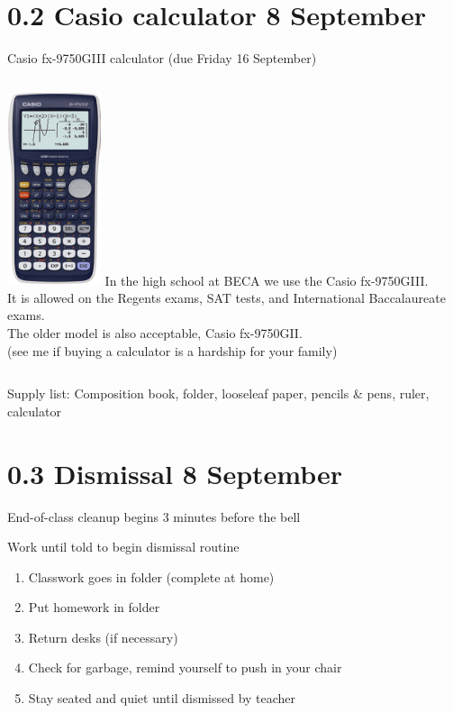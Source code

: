 \documentclass[onlytextwidth]{beamer}
\begin{document}
\section{0.2 Casio calculator \hfill 8 September}
\begin{frame}{Casio fx-9750GIII calculator (due Friday 16 September)}
  \begin{columns}
      \includegraphics[width=2.75cm]{../graphics/casio_fx-9750GII.png}
      In the high school at BECA we use the Casio fx-9750GIII.\\[5pt] 
      It is allowed on the Regents exams, SAT tests, and International Baccalaureate exams.\\[5pt]
      The older model is also acceptable, Casio fx-9750\alert{GII}.\\[5pt]
      (see me if buying a calculator is a hardship for your family)
    \end{columns} \vspace{1cm}
  Supply list: Composition book, folder, looseleaf paper, pencils \& pens, ruler, calculator
\end{frame}

\section{0.3 Dismissal \hfill 8 September}
\begin{frame}{End-of-class cleanup begins 3 minutes before the bell}
  \begin{block}{Work until told to begin dismissal routine}
    \begin{enumerate}
      \item Classwork goes in folder (complete at home)
      \item Put homework in folder
      \item Return desks (if necessary)
      \item Check for garbage, remind yourself to push in your chair
      \item Stay seated and quiet until dismissed by teacher
    \end{enumerate}
    \end{block}
  \end{frame}
\end{document}
